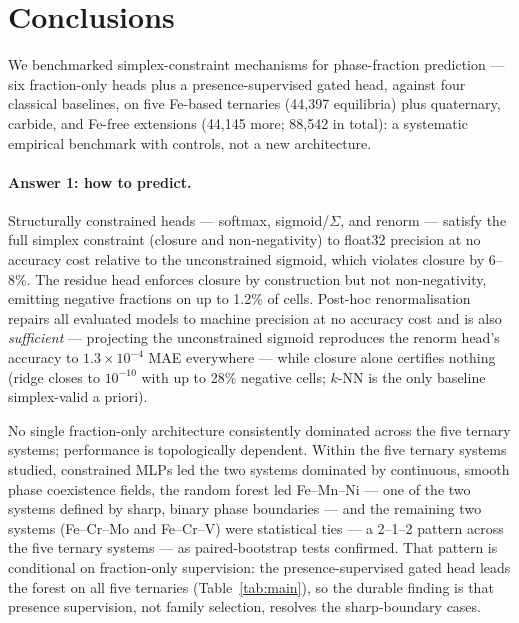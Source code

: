 \documentclass[preprint,12pt,authoryear]{elsarticle}
\begin{document}
\section{Conclusions}
\label{sec:conclusions}

We benchmarked simplex-constraint mechanisms for phase-fraction
prediction --- six fraction-only heads plus a presence-supervised gated
head, against four classical baselines, on five Fe-based ternaries
(44{,}397 equilibria) plus quaternary, carbide, and Fe-free extensions
(44{,}145 more; 88{,}542 in total): a systematic empirical benchmark with
controls,
not a new architecture.

\paragraph{Answer 1: how to predict.}
Structurally constrained heads --- softmax, sigmoid/$\Sigma$, and renorm ---
satisfy the full simplex constraint (closure and non-negativity) to float32
precision at no accuracy cost relative to the unconstrained sigmoid, which
violates closure by 6--8\%. The residue head enforces closure by
construction but not non-negativity, emitting negative fractions on up to
1.2\% of cells. Post-hoc renormalisation repairs all evaluated models to machine
precision at no accuracy cost and is also \emph{sufficient} --- projecting
the unconstrained sigmoid reproduces the renorm head's accuracy to
$1.3\times10^{-4}$ MAE everywhere --- while closure alone certifies
nothing (ridge closes to $10^{-10}$ with up to 28\% negative cells;
$k$-NN is the only baseline simplex-valid a priori).

No single fraction-only architecture consistently dominated across the five
ternary systems; performance is topologically dependent. Within the five
ternary systems studied, constrained MLPs led the two systems dominated by
continuous, smooth phase coexistence fields, the random forest led
Fe--Mn--Ni --- one of the two systems defined by sharp, binary phase
boundaries --- and the remaining two systems (Fe--Cr--Mo and Fe--Cr--V)
were statistical ties --- a 2--1--2 pattern across the five ternary
systems --- as paired-bootstrap tests confirmed. That pattern is
conditional on fraction-only supervision: the presence-supervised gated
head leads the forest on all five ternaries
(Table~\ref{tab:main}), so the durable finding is that presence
supervision, not family selection, resolves the sharp-boundary cases.
\end{document}
